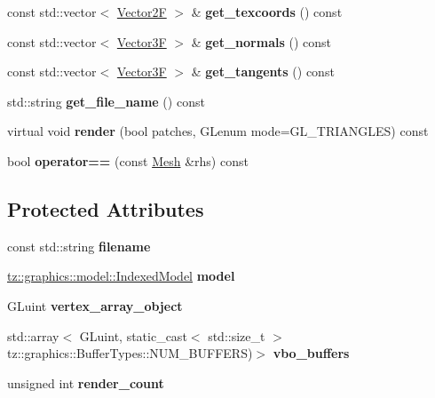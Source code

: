 \begin{DoxyCompactItemize}
const std\+::vector$<$ \mbox{\hyperlink{class_vector2}{Vector2F}} $>$ \& {\bfseries get\+\_\+texcoords} () const
\item 
\mbox{\label{class_mesh_aa572cef8bcca33c5eb0240be4c83421d}} 
const std\+::vector$<$ \mbox{\hyperlink{class_vector3}{Vector3F}} $>$ \& {\bfseries get\+\_\+normals} () const
\item 
\mbox{\label{class_mesh_a4fcfee8b20fbd534bfeeb2c67a06c4df}} 
const std\+::vector$<$ \mbox{\hyperlink{class_vector3}{Vector3F}} $>$ \& {\bfseries get\+\_\+tangents} () const
\item 
\mbox{\label{class_mesh_ade35393b24319722a76fdfa608e33928}} 
std\+::string {\bfseries get\+\_\+file\+\_\+name} () const
\item 
\mbox{\label{class_mesh_a7efc4ae895a9fac0deda8c5c945c9497}} 
virtual void {\bfseries render} (bool patches, G\+Lenum mode=G\+L\+\_\+\+T\+R\+I\+A\+N\+G\+L\+ES) const
\item 
\mbox{\label{class_mesh_a60ab059d5837a5a7bdf4beac14c19b55}} 
bool {\bfseries operator==} (const \mbox{\hyperlink{class_mesh}{Mesh}} \&rhs) const
\end{DoxyCompactItemize}
\subsection*{Protected Attributes}
\begin{DoxyCompactItemize}
\item 
\mbox{\label{class_mesh_acd6d79d8a54c6f310cbeccbd5726b942}} 
const std\+::string {\bfseries filename}
\item 
\mbox{\label{class_mesh_a9cabf6b1628f877e6c37f55238c01cce}} 
\mbox{\hyperlink{classtz_1_1graphics_1_1model_1_1_indexed_model}{tz\+::graphics\+::model\+::\+Indexed\+Model}} {\bfseries model}
\item 
\mbox{\label{class_mesh_a5e3901e2d45063e199b701088b28a19c}} 
G\+Luint {\bfseries vertex\+\_\+array\+\_\+object}
\item 
\mbox{\label{class_mesh_aded7c34208b8999adf036b587c9aab1a}} 
std\+::array$<$ G\+Luint, static\+\_\+cast$<$ std\+::size\+\_\+t $>$tz\+::graphics\+::\+Buffer\+Types\+::\+N\+U\+M\+\_\+\+B\+U\+F\+F\+E\+RS)$>$ {\bfseries vbo\+\_\+buffers}
\item 
\mbox{\label{class_mesh_a426c8e3e3f8b0f11fc0edcf46e39f87b}} 
unsigned int {\bfseries render\+\_\+count}
\end{DoxyCompactItemize}


